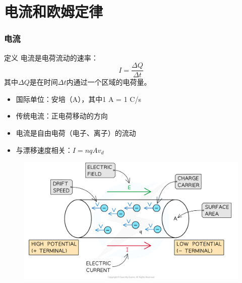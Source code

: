 \documentclass{beamer}
\begin{document}
\section{电流和欧姆定律}
\begin{frame}
    \frametitle{电流}
    \begin{block}{定义}
        电流是电荷流动的速率：
        \[ I = \frac{\Delta Q}{\Delta t} \]
        其中$\Delta Q$是在时间$\Delta t$内通过一个区域的电荷量。
    \end{block}
    \begin{itemize}
        \item 国际单位：安培（A），其中1 A = 1 C/s
        \item 传统电流：正电荷移动的方向
        \item 电流是自由电荷（电子、离子）的流动
        \item 与漂移速度相关：$I = nqAv_d$
    \end{itemize}
\end{frame}
\begin{frame}{}
    \begin{figure}
        \centering
        \includegraphics[width=1\linewidth]{phys12-circuits-charge-carrier-drift.png}
    \end{figure}
\end{frame}
\end{document}
